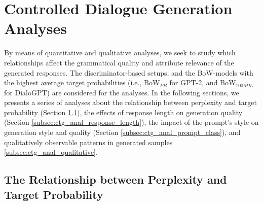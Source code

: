 










\section{Controlled Dialogue Generation Analyses}
\label{sec:exp2_analyses}

By means of quantitative and qualitative analyses, we seek to study which relationships affect the grammatical quality and attribute relevance of the generated responses. The discriminator-based setups, and the BoW-models with the highest average target probabilities (i.e., BoW$_{FB}$ for GPT-2, and BoW$_{100MIU}$ for DialoGPT) are considered for the analyses. In the following sections, we presents a series of analyses about the relationship between perplexity and target probability (Section \ref{subsec:ctg_anal_ppl_target_prob}), the effects of response length on generation quality (Section \ref{subsec:ctg_anal_response_length}), the impact of the prompt's style on generation style and quality (Section \ref{subsec:ctg_anal_prompt_class}), and qualitatively observable patterns in generated samples \ref{subsec:ctg_anal_qualitative}.




\subsection{The Relationship between Perplexity and Target Probability}
\label{subsec:ctg_anal_ppl_target_prob}


